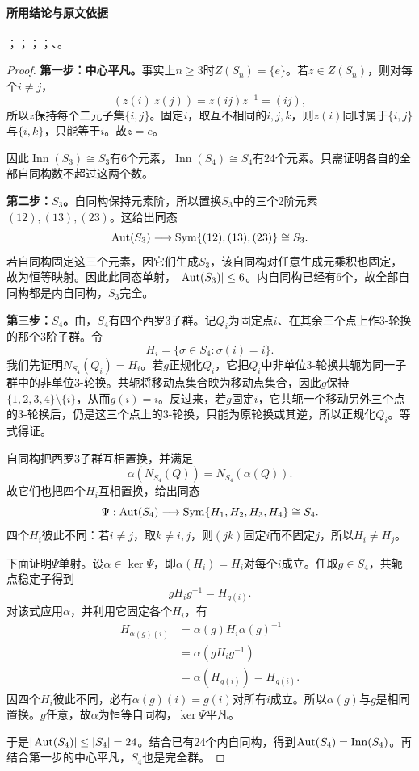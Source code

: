 \paragraph{所用结论与原文依据}
；；；；、。


\begin{proof}
\textbf{第一步：中心平凡。}事实上$n\ge3$时$Z(S_n)=\{e\}$。若$z\in Z(S_n)$，则对每个$i\ne j$，
\[
(z(i)\ z(j))=z(ij)z^{-1}=(ij),
\]
所以$z$保持每个二元子集$\{i,j\}$。固定$i$，取互不相同的$i,j,k$，则$z(i)$同时属于$\{i,j\}$与$\{i,k\}$，只能等于$i$。故$z=e$。

因此$\operatorname{Inn}(S_3)\cong S_3$有6个元素，$\operatorname{Inn}(S_4)\cong S_4$有24个元素。只需证明各自的全部自同构数不超过这两个数。

\textbf{第二步：$S_3$。}自同构保持元素阶，所以置换$S_3$中的三个2阶元素$(12),(13),(23)$。这给出同态
\[
\operatorname{Aut}(S_3)\longrightarrow\operatorname{Sym}\{(12),(13),(23)\}\cong S_3.
\]
若自同构固定这三个元素，因它们生成$S_3$，该自同构对任意生成元乘积也固定，故为恒等映射。因此此同态单射，$|\operatorname{Aut}(S_3)|\le6$。内自同构已经有6个，故全部自同构都是内自同构，$S_3$完全。

\textbf{第三步：$S_4$。}由，$S_4$有四个西罗3子群。记$Q_i$为固定点$i$、在其余三个点上作3-轮换的那个3阶子群。令
\[
H_i=\{\sigma\in S_4:\sigma(i)=i\}.
\]
我们先证明$N_{S_4}(Q_i)=H_i$。若$g$正规化$Q_i$，它把$Q_i$中非单位3-轮换共轭为同一子群中的非单位3-轮换。共轭将移动点集合映为移动点集合，因此$g$保持$\{1,2,3,4\}\setminus\{i\}$，从而$g(i)=i$。反过来，若$g$固定$i$，它共轭一个移动另外三个点的3-轮换后，仍是这三个点上的3-轮换，只能为原轮换或其逆，所以正规化$Q_i$。等式得证。

自同构把西罗3子群互相置换，并满足
\[
\alpha(N_{S_4}(Q))=N_{S_4}(\alpha(Q)).
\]
故它们也把四个$H_i$互相置换，给出同态
\[
\Psi:\operatorname{Aut}(S_4)\longrightarrow\operatorname{Sym}\{H_1,H_2,H_3,H_4\}\cong S_4.
\]
四个$H_i$彼此不同：若$i\ne j$，取$k\ne i,j$，则$(jk)$固定$i$而不固定$j$，所以$H_i\ne H_j$。

下面证明$\Psi$单射。设$\alpha\in\ker\Psi$，即$\alpha(H_i)=H_i$对每个$i$成立。任取$g\in S_4$，共轭点稳定子得到
\[
gH_ig^{-1}=H_{g(i)}.
\]
对该式应用$\alpha$，并利用它固定各个$H_i$，有
\begin{align*}
H_{\alpha(g)(i)}
&=\alpha(g)H_i\alpha(g)^{-1}\\
&=\alpha(gH_ig^{-1})\\
&=\alpha(H_{g(i)})=H_{g(i)}.
\end{align*}
因四个$H_i$彼此不同，必有$\alpha(g)(i)=g(i)$对所有$i$成立。所以$\alpha(g)$与$g$是相同置换。$g$任意，故$\alpha$为恒等自同构，$\ker\Psi$平凡。

于是$|\operatorname{Aut}(S_4)|\le|S_4|=24$。结合已有24个内自同构，得到$\operatorname{Aut}(S_4)=\operatorname{Inn}(S_4)$。再结合第一步的中心平凡，$S_4$也是完全群。
\end{proof}


